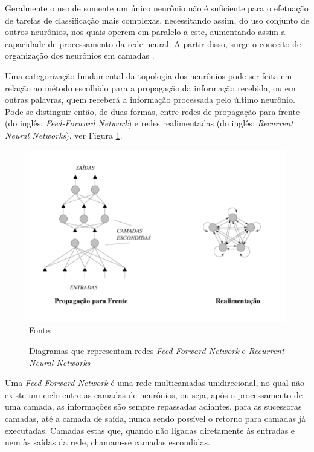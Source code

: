  Geralmente o uso de somente um único neurônio não é suficiente para o efetuação de tarefas de classificação mais complexas, necessitando assim, do uso conjunto de outros neurônios, nos quais operem em paralelo a este, aumentando assim a capacidade de processamento da rede neural. A partir disso, surge o conceito de organização dos neurônios em camadas \citep{duda1973pattern, bishop2006pattern, martin2018speech}. 
 
 Uma categorização fundamental da topologia dos neurônios pode ser feita em relação ao método escolhido para a propagação da informação recebida, ou em outras palavras, quem receberá a informação processada pelo último neurônio. Pode-se distinguir então, de duas formas, entre redes de propagação para frente (do inglês: \textit{Feed-Forward Network}) e redes realimentadas (do inglês: \textit{Recurrent Neural Networks}), ver Figura \ref{fig:graphNeuron2}.
 
 \begin{figure}[ht!]
\caption{Diagramas que representam redes \textit{Feed-Forward Network} e \textit{Recurrent Neural Networks}}
\label{fig:graphNeuron2}
\centering
\includegraphics[scale=0.5]{img/graphNeuron2.png}
{\fontsize{11pt}{\baselineskip}\selectfont
\\Fonte: \cite{Rauber2005}
}
\end{figure}
 
 Uma \textit{Feed-Forward Network} é uma rede multicamadas unidirecional, no qual não existe um ciclo entre as camadas de neurônios, ou seja, após o processamento de uma camada, as informações são sempre repassadas adiantes, para as sucessoras camadas, até a camada de saída, nunca sendo possível o retorno para camadas já executadas. Camadas estas que, quando não ligadas diretamente às entradas e nem às saídas da rede, chamam-se camadas escondidas. 
 
